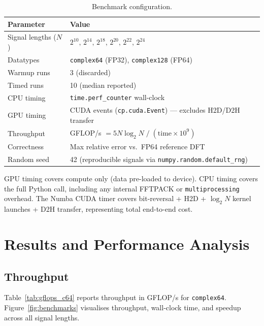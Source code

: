 \documentclass[12pt, letterpaper]{article}
\begin{document}
\begin{table}[H]
\centering
\caption{Benchmark configuration.}
\begin{tabular}{@{}ll@{}}
\toprule
\textbf{Parameter} & \textbf{Value} \\
\midrule
Signal lengths ($N$) & $2^{10},\,2^{14},\,2^{18},\,2^{20},\,2^{22},\,2^{24}$ \\
Datatypes & \texttt{complex64} (FP32), \texttt{complex128} (FP64) \\
Warmup runs & 3 (discarded) \\
Timed runs & 10 (median reported) \\
CPU timing & \texttt{time.perf\_counter} wall-clock \\
GPU timing & CUDA events (\texttt{cp.cuda.Event}) --- excludes H2D/D2H transfer \\
Throughput & GFLOP/s $= 5N\log_2 N \;/\; (\text{time} \times 10^9)$ \\
Correctness & Max relative error vs.\ FP64 reference DFT \\
Random seed & 42 (reproducible signals via \texttt{numpy.random.default\_rng}) \\
\bottomrule
\end{tabular}
\label{tab:method}
\end{table}

GPU timing covers compute only (data pre-loaded to device). CPU timing covers the full Python call, including any internal FFTPACK or \texttt{multiprocessing} overhead. The Numba CUDA timer covers bit-reversal + H2D + $\log_2 N$ kernel launches + D2H transfer, representing total end-to-end cost.

\section{Results and Performance Analysis}
\label{sec:results}

\subsection{Throughput}

Table~\ref{tab:gflops_c64} reports throughput in GFLOP/s for \texttt{complex64}. Figure~\ref{fig:benchmarks} visualises throughput, wall-clock time, and speedup across all signal lengths.
\end{document}
